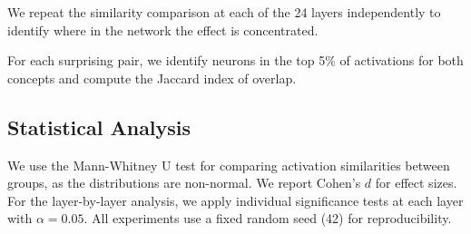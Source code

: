 We repeat the similarity comparison at each of the 24 layers independently to identify where in the network the effect is concentrated.

For each surprising pair, we identify neurons in the top 5\% of activations for both concepts and compute the Jaccard index of overlap.

\subsection{Statistical Analysis}
\label{sec:stats}

We use the Mann-Whitney U test for comparing activation similarities between groups, as the distributions are non-normal.
We report Cohen's $d$ for effect sizes.
For the layer-by-layer analysis, we apply individual significance tests at each layer with $\alpha = 0.05$.
All experiments use a fixed random seed (42) for reproducibility.
